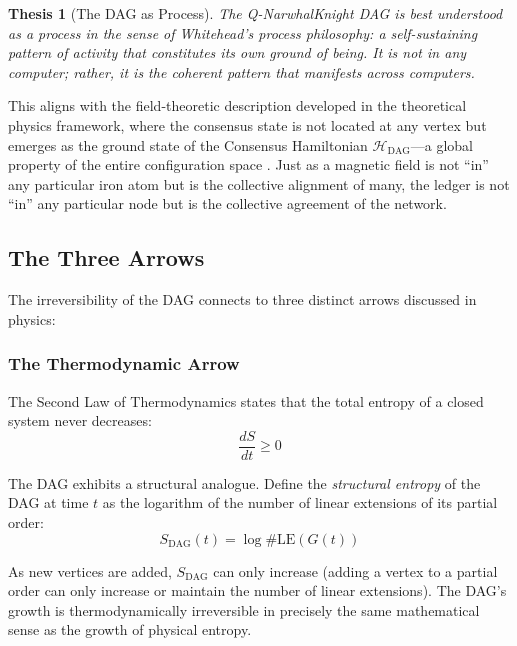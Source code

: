 \documentclass[12pt,a4paper]{article}
\theoremstyle{philosophical}
\newtheorem{thesis}{Thesis}
\begin{document}
\begin{thesis}[The DAG as Process]
\label{thesis:process}
The Q-NarwhalKnight DAG is best understood as a \emph{process} in the sense of Whitehead's process philosophy: a self-sustaining pattern of activity that constitutes its own ground of being. It is not \emph{in} any computer; rather, it \emph{is} the coherent pattern that manifests \emph{across} computers.
\end{thesis}

This aligns with the field-theoretic description developed in the theoretical physics framework, where the consensus state is not located at any vertex but emerges as the ground state of the Consensus Hamiltonian $\mathcal{H}_{\mathrm{DAG}}$---a global property of the entire configuration space \cite{qnk-physics}. Just as a magnetic field is not ``in'' any particular iron atom but is the collective alignment of many, the ledger is not ``in'' any particular node but is the collective agreement of the network.

\subsection{The Three Arrows}

The irreversibility of the DAG connects to three distinct arrows discussed in physics:

\subsubsection{The Thermodynamic Arrow}

The Second Law of Thermodynamics states that the total entropy of a closed system never decreases:
\begin{equation}
\frac{dS}{dt} \geq 0
\end{equation}

The DAG exhibits a structural analogue. Define the \emph{structural entropy} of the DAG at time $t$ as the logarithm of the number of linear extensions of its partial order:
\begin{equation}
S_{\mathrm{DAG}}(t) = \log \#\mathrm{LE}(G(t))
\end{equation}

As new vertices are added, $S_{\mathrm{DAG}}$ can only increase (adding a vertex to a partial order can only increase or maintain the number of linear extensions). The DAG's growth is thermodynamically irreversible in precisely the same mathematical sense as the growth of physical entropy.
\end{document}
